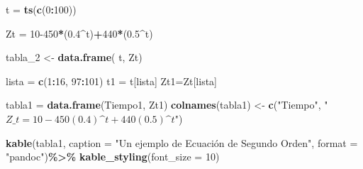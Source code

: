 \documentclass[
]{book}
\newenvironment{Shaded}{\begin{snugshade}}{\end{snugshade}}
\newcommand{\AttributeTok}[1]{\textcolor[rgb]{0.13,0.29,0.53}{#1}}
\newcommand{\DecValTok}[1]{\textcolor[rgb]{0.00,0.00,0.81}{#1}}
\newcommand{\FloatTok}[1]{\textcolor[rgb]{0.00,0.00,0.81}{#1}}
\newcommand{\FunctionTok}[1]{\textcolor[rgb]{0.13,0.29,0.53}{\textbf{#1}}}
\newcommand{\NormalTok}[1]{#1}
\newcommand{\OtherTok}[1]{\textcolor[rgb]{0.56,0.35,0.01}{#1}}
\newcommand{\SpecialCharTok}[1]{\textcolor[rgb]{0.81,0.36,0.00}{\textbf{#1}}}
\newcommand{\StringTok}[1]{\textcolor[rgb]{0.31,0.60,0.02}{#1}}
\begin{document}
\begin{Shaded}
\begin{Highlighting}[]
\NormalTok{t }\OtherTok{=} \FunctionTok{ts}\NormalTok{(}\FunctionTok{c}\NormalTok{(}\DecValTok{0}\SpecialCharTok{:}\DecValTok{100}\NormalTok{))}

\NormalTok{Zt }\OtherTok{=} \DecValTok{10{-}450}\SpecialCharTok{*}\NormalTok{(}\FloatTok{0.4}\SpecialCharTok{\^{}}\NormalTok{t)}\SpecialCharTok{+}\DecValTok{440}\SpecialCharTok{*}\NormalTok{(}\FloatTok{0.5}\SpecialCharTok{\^{}}\NormalTok{t)}

\NormalTok{tabla\_2 }\OtherTok{\textless{}{-}} \FunctionTok{data.frame}\NormalTok{( t, Zt) }

\NormalTok{lista }\OtherTok{=} \FunctionTok{c}\NormalTok{(}\DecValTok{1}\SpecialCharTok{:}\DecValTok{16}\NormalTok{, }\DecValTok{97}\SpecialCharTok{:}\DecValTok{101}\NormalTok{)}
\NormalTok{t1 }\OtherTok{=}\NormalTok{ t[lista]}
\NormalTok{Zt1}\OtherTok{=}\NormalTok{Zt[lista]}


\NormalTok{tabla1 }\OtherTok{=} \FunctionTok{data.frame}\NormalTok{(Tiempo1, Zt1)}
\FunctionTok{colnames}\NormalTok{(tabla1) }\OtherTok{\textless{}{-}} \FunctionTok{c}\NormalTok{(}\StringTok{"Tiempo"}\NormalTok{, }\StringTok{"$Z\_t =10{-}450(0.4)\^{}t+440(0.5)\^{}t$"}\NormalTok{)}

\FunctionTok{kable}\NormalTok{(tabla1, }
      \AttributeTok{caption =} \StringTok{"Un ejemplo de Ecuación de Segundo Orden"}\NormalTok{, }
      \AttributeTok{format =} \StringTok{"pandoc"}\NormalTok{)}\SpecialCharTok{\%\textgreater{}\%}
  \FunctionTok{kable\_styling}\NormalTok{(}\AttributeTok{font\_size =} \DecValTok{10}\NormalTok{)}
\end{Highlighting}
\end{Shaded}
\end{document}

